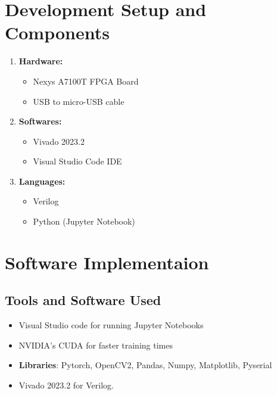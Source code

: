 \documentclass{article}
\begin{document}
\begin{figure}[!hbt]
        \noindent{}
        \caption{}
    \end{figure}
    
\section{Development Setup and Components}
     \large 
     \begin{enumerate}
        \item \textbf{Hardware:}
            \begin{itemize}
                \item Nexys A7100T FPGA Board
                \item USB to micro-USB cable
            \end{itemize}
     
         \item \textbf{Softwares:}
         \begin{itemize}
             \item Vivado 2023.2
             \item Visual Studio Code IDE
         \end{itemize}

         \item \textbf{Languages:}
         \begin{itemize}
             \item Verilog
             \item Python (Jupyter Notebook)
         \end{itemize}
     \end{enumerate}
    
\section{Software Implementaion}
\subsection{Tools and Software Used}
\begin{itemize}
\item Visual Studio code for running Jupyter Notebooks
\item NVIDIA's CUDA for faster training times
\item \textbf{Libraries}: Pytorch, OpenCV2, Pandas, Numpy, Matplotlib, Pyserial
\item Vivado 2023.2 for Verilog.
\end{itemize}
\end{document}
